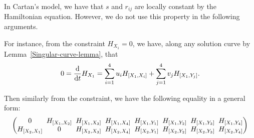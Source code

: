 \begin{Remark}
In Cartan's model, we have that $s$ and $r_{ij}$ are locally constant by the Hamiltonian equation.
However, we do not use this property in the following arguments.
\end{Remark}

For instance, from the constraint $H_{X_1} = 0$, we have, along any solution curve
by Lemma~\ref{Singular-curve-lemma}, that
\[
0 = \frac{{\rm d}}{{\rm d}t}H_{X_1} = \sum_{i=1}^4 u_iH_{[X_1, X_i]} + \sum_{j=1}^4 v_jH_{[X_1, Y_j]}.
\]

Then similarly from the constraint, we have the following equality in a general form:
\begin{gather*}
\begin{pmatrix}
0 \hspace{-2.3pt}&\hspace{-2.3pt} H_{[X_1, X_2]} \hspace{-2.3pt}&\hspace{-2.3pt} H_{[X_1, X_3]} \hspace{-2.3pt}&\hspace{-2.3pt} H_{[X_1, X_4]} \hspace{-2.3pt}&\hspace{-2.3pt} H_{[X_1, Y_1]} \hspace{-2.3pt}&\hspace{-2.3pt} H_{[X_1, Y_2]} \hspace{-2.3pt}&\hspace{-2.3pt} H_{[X_1, Y_3]} \hspace{-2.3pt}&\hspace{-2.3pt}
H_{[X_1, Y_4]}
\\
H_{[X_2, X_1]} \hspace{-2.3pt}&\hspace{-2.3pt} 0 \hspace{-2.3pt}&\hspace{-2.3pt} H_{[X_2, X_3]} \hspace{-2.3pt}&\hspace{-2.3pt} H_{[X_2, X_4]} \hspace{-2.3pt}&\hspace{-2.3pt} H_{[X_2, Y_1]} \hspace{-2.3pt}&\hspace{-2.3pt} H_{[X_2, Y_2]} \hspace{-2.3pt}&\hspace{-2.3pt} H_{[X_2, Y_3]} \hspace{-2.3pt}&\hspace{-2.3pt}
H_{[X_2, Y_4]}

\end{pmatrix}
\end{gather*}
